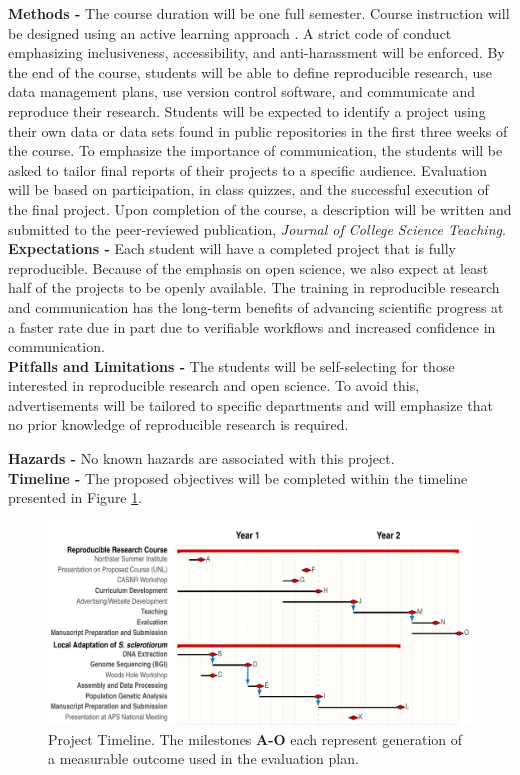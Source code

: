 \documentclass[12pt,letterpaper]{article}
\begin{document}
\noindent \textbf{Methods -}
The course duration will be one full semester. 
Course instruction will be designed using an active learning approach \citep{freeman2014active}.
A strict code of conduct emphasizing inclusiveness, accessibility, and anti-harassment will be enforced.
By the end of the course, students will be able to define reproducible research, use data management plans, use version control software, and communicate and reproduce their research.
Students will be expected to identify a project using their own data or data sets found in public repositories in the first three weeks of the course.
To emphasize the importance of communication, the students will be asked to tailor final reports of their projects to a specific audience.
Evaluation will be based on participation, in class quizzes, and the successful execution of the final project.
Upon completion of the course, a description will be written and submitted to the peer-reviewed publication, \textit{Journal of College Science Teaching}.\\
\noindent \textbf{Expectations -}
Each student will have a completed project that is fully reproducible. 
Because of the emphasis on open science, we also expect at least half of the projects to be openly available.
The training in reproducible research and communication has the long-term benefits of advancing scientific progress at a faster rate due in part due to verifiable workflows and increased confidence in communication.\\
\noindent \textbf{Pitfalls and Limitations -}
The students will be self-selecting for those interested in reproducible research and open science.
To avoid this, advertisements will be tailored to specific departments and will emphasize that no prior knowledge of reproducible research is required.

\noindent \textbf{Hazards -} No known hazards are associated with this project.\\
\noindent \textbf{Timeline -} The proposed objectives will be completed within the timeline presented in Figure \ref{fig:timeline}.

\begin{figure}[!htbp]
  \centering
  \includegraphics[width=\textwidth]{packet/timeline.pdf}
  \caption{Project Timeline. The milestones \textbf{A-O} each represent generation of a measurable outcome used in the evaluation plan.}
  \label{fig:timeline}
\end{figure}
\end{document}

